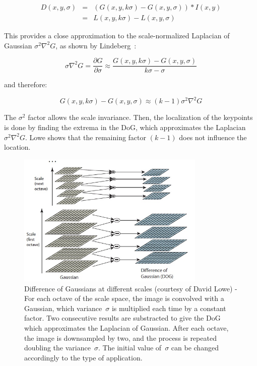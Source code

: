 \[
\begin{array}{rcl}
D(x,y,\sigma) & = & (G(x,y, k\sigma) - G(x,y,\sigma)) * I(x,y) \\
 & = & L(x,y,k\sigma) - L(x,y,\sigma)
\end{array}
\] 

This provides a close approximation to the scale-normalized Laplacian of Gaussian $\sigma^2\nabla^2G$, as shown by Lindeberg~\cite{Lindeberg_1994}:

\[ \sigma\nabla^2G = \frac{\partial G}{\partial \sigma} \approx \frac{G(x,y,k\sigma)-G(x,y,\sigma)}{k\sigma - \sigma} \]

and therefore:

\[ G(x,y,k\sigma) - G(x,y,\sigma) \approx (k-1)\sigma^2\nabla^2G \]

The $\sigma^2$ factor allows the scale invariance. Then, the localization of the keypoints is done by finding the extrema in the \gls{DoG}, which approximates the Laplacian~$\sigma^2\nabla^2G$. Lowe shows that the remaining factor $(k-1)$ does not influence the location. 

\begin{figure}[h]
\centering
\includegraphics[width=0.8\textwidth]{figures/sift_dog}
\caption{Difference of Gaussians at different scales (courtesy of David Lowe) - For each octave of the scale space, the image is convolved with a Gaussian, which variance~$\sigma$ is multiplied each time by a constant factor. Two consecutive results are substracted to give the DoG which approximates the Laplacian of Gaussian. After each octave, the image is downsampled by two, and the process is repeated doubling the variance~$\sigma$. The initial value of~$\sigma$ can be changed accordingly to the type of application. }
\label{fig:sift_dog}
\end{figure}

